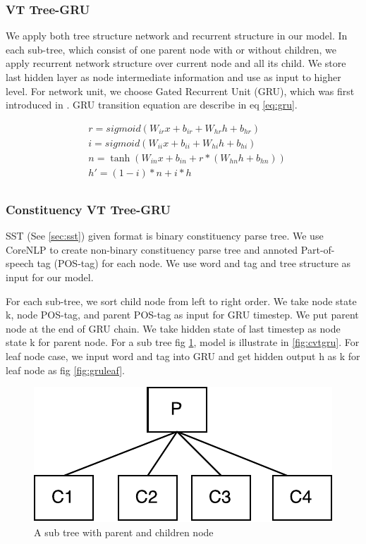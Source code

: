\subsubsection{VT Tree-GRU}
We apply both tree structure network and recurrent structure in our model. In each sub-tree, which consist of one parent node with or without children, we apply recurrent network structure over current node and all its child. We store last hidden layer as node intermediate information and use as input to higher level. For network unit, we choose Gated Recurrent Unit (GRU), which was first introduced in \cite{cho2014learning}. GRU transition equation are describe in eq \ref{eq:gru}. 

\begin{equation}
\label{eq:gru}
\begin{aligned}
&r = sigmoid(W_{ir} x + b_{ir} + W_{hr} h + b_{hr}) \\
&i = sigmoid(W_{ii} x + b_{ii} + W_{hi} h + b_{hi}) \\
&n = \tanh(W_{in} x + b_{in} + r * (W_{hn} h + b_{hn})) \\
&h' = (1 - i) * n + i * h\\
\end{aligned}
\end{equation}

\subsubsection{Constituency VT Tree-GRU} \label{sec:VTtreeConstituency}
SST (See \ref{sec:sst}) given format is binary constituency parse tree. We use CoreNLP \cite{manning2014stanford} to create non-binary constituency parse tree and annoted Part-of-speech tag (POS-tag) for each node. We use word and tag and tree structure as input for our model.

For each sub-tree, we sort child node from left to right order. We take node state k, node POS-tag, and parent POS-tag as input for GRU timestep. We put parent node at the end of GRU chain. We take hidden state of last timestep as node state k for parent node. For a sub tree fig \ref{fig:treecp}, model is illustrate in \ref{fig:cvtgru}. For leaf node case, we input word and tag into GRU and get hidden output h as k for leaf node as fig \ref{fig:gruleaf}.
\begin{figure}[H]
	\centering
	\includegraphics[width=0.5\linewidth]{figure/treecp}
	\caption[A sub tree with parent and children node]{A sub tree with parent and children node}
	\label{fig:treecp}
\end{figure}

